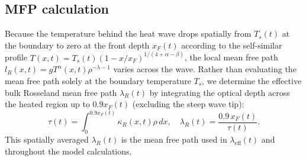 \documentclass[11pt]{article}
\begin{document}
\subsection{MFP calculation}
Because the temperature behind the heat wave drops spatially from $T_s(t)$ at the boundary to zero at the front depth $x_F(t)$ according to the self-similar profile $T(x,t)=T_s(t)(1-x/x_F)^{1/(4+\alpha-\beta)}$, the local mean free path $l_R(x,t)=g T^\alpha(x,t)\rho^{-\lambda-1}$ varies across the wave. Rather than evaluating the mean free path solely at the boundary temperature $T_s$, we determine the effective bulk Rosseland mean free path $\lambda_R(t)$ by integrating the optical depth across the heated region up to $0.9x_F(t)$ (excluding the steep wave tip):
\begin{equation}
    \tau(t) = \int_0^{0.9 x_F(t)} \kappa_R(x,t)\rho\,dx, \quad \lambda_R(t) = \frac{0.9\,x_F(t)}{\tau(t)}.
\end{equation}
This spatially averaged $\lambda_R(t)$ is the mean free path used in $\lambda_{\mathrm{eff}}(t)$ and throughout the model calculations.
\end{document}
